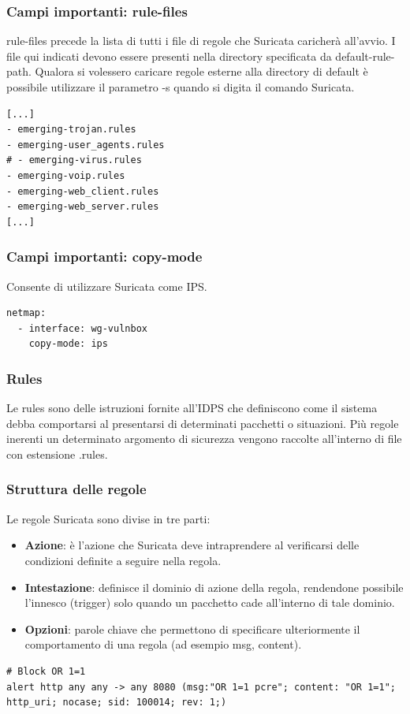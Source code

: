 \documentclass[aspectratio=169]{beamer}
\renewcommand\texttt[1]{{\ttfamily\color{red2}#1}}
\begin{document}
    \begin{frame}[fragile]
        \frametitle{Campi importanti: rule-files}
        \texttt{rule-files} precede la lista di tutti i file di regole che Suricata caricherà all'avvio. I file qui indicati devono essere presenti nella directory specificata da \texttt{default-rule-path}. Qualora si volessero caricare regole esterne alla directory di default è possibile utilizzare il parametro \texttt{-s} quando si digita il comando Suricata.
        \vskip 0.3cm
        \begin{lstlisting}
[...]
- emerging-trojan.rules
- emerging-user_agents.rules
# - emerging-virus.rules
- emerging-voip.rules
- emerging-web_client.rules
- emerging-web_server.rules
[...]
        \end{lstlisting}
    \end{frame}
    \begin{frame}[fragile]
        \frametitle{Campi importanti: copy-mode}
    Consente di utilizzare Suricata come IPS.
    \vskip 0.3cm
    \begin{lstlisting}
netmap:
  - interface: wg-vulnbox
    copy-mode: ips
    \end{lstlisting}
    \end{frame}
    
    \begin{frame}
        \frametitle{Rules}
        Le rules sono delle istruzioni fornite all'IDPS che definiscono come il sistema debba comportarsi al presentarsi di determinati pacchetti o situazioni. Più regole inerenti un determinato argomento di sicurezza
        vengono raccolte all'interno di file con estensione \texttt{.rules}.
    \end{frame}
    
    \begin{frame}[fragile]
        \frametitle{Struttura delle regole}
        Le regole Suricata sono divise in tre parti:
        \begin{itemize}
            \item \textbf{Azione}: è l'azione che Suricata deve intraprendere al verificarsi delle condizioni definite a seguire nella regola.
            \item \textbf{Intestazione}: definisce il dominio di azione della regola, rendendone possibile l'innesco (trigger) solo quando un pacchetto cade all'interno di tale dominio.
            \item \textbf{Opzioni}: parole chiave che permettono di specificare ulteriormente il comportamento di una regola (ad esempio \texttt{msg}, \texttt{content}). 
        \end{itemize}
        \begin{lstlisting}
# Block OR 1=1
alert http any any -> any 8080 (msg:"OR 1=1 pcre"; content: "OR 1=1"; http_uri; nocase; sid: 100014; rev: 1;)
        \end{lstlisting}
    \end{frame}
    
\end{document}
